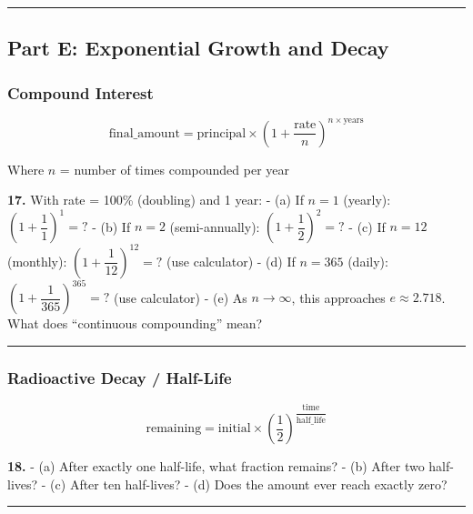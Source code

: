 \documentclass[
  11pt,
]{article}
\begin{document}
\begin{center}\rule{0.5\linewidth}{0.5pt}\end{center}

\hypertarget{part-e-exponential-growth-and-decay}{%
\subsection{Part E: Exponential Growth and
Decay}\label{part-e-exponential-growth-and-decay}}

\hypertarget{compound-interest}{%
\subsubsection{Compound Interest}\label{compound-interest}}

\[\text{final\_amount} = \text{principal} \times \left(1 + \dfrac{\text{rate}}{n}\right)^{n \times \text{years}}\]

Where \(n\) = number of times compounded per year

\textbf{17.} With rate = 100\% (doubling) and 1 year: - (a) If \(n = 1\)
(yearly): \(\left(1 + \dfrac{1}{1}\right)^1 = ?\) - (b) If \(n = 2\)
(semi-annually): \(\left(1 + \dfrac{1}{2}\right)^2 = ?\) - (c) If
\(n = 12\) (monthly): \(\left(1 + \dfrac{1}{12}\right)^{12} = ?\) (use
calculator) - (d) If \(n = 365\) (daily):
\(\left(1 + \dfrac{1}{365}\right)^{365} = ?\) (use calculator) - (e) As
\(n \to \infty\), this approaches \(e \approx 2.718\). What does
``continuous compounding'' mean?

\begin{center}\rule{0.5\linewidth}{0.5pt}\end{center}

\hypertarget{radioactive-decay-half-life}{%
\subsubsection{Radioactive Decay /
Half-Life}\label{radioactive-decay-half-life}}

\[\text{remaining} = \text{initial} \times \left(\dfrac{1}{2}\right)^{\dfrac{\text{time}}{\text{half\_life}}}\]

\textbf{18.} - (a) After exactly one half-life, what fraction remains? -
(b) After two half-lives? - (c) After ten half-lives? - (d) Does the
amount ever reach exactly zero?

\begin{center}\rule{0.5\linewidth}{0.5pt}\end{center}
\end{document}
